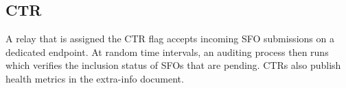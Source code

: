 %

%
%

\subsection{CTR} \label{sec:design:ctr}
A relay that is assigned the CTR flag accepts incoming SFO submissions on a
dedicated endpoint.  At random time intervals, an auditing process then runs
which verifies the inclusion status of SFOs that are pending.  CTRs also
publish health metrics in the extra-info document.

